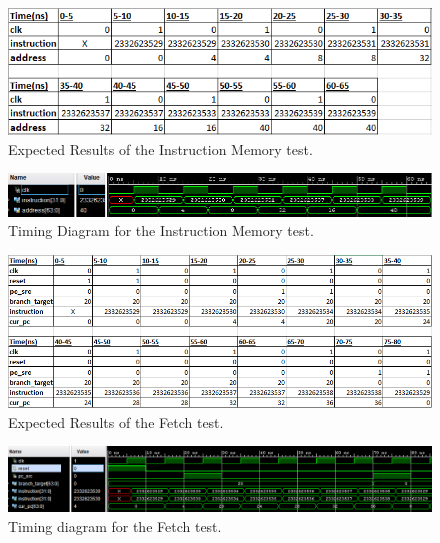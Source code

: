 \documentclass{article}
\begin{document}
\begin{figure}[H]
	\begin{center}
		\caption{Expected Results of the Instruction Memory test.}\label{fig:ert_instmemtest}
		\includegraphics[width=1.0\textwidth]{../images/InstrMemExpected.png}
	\end{center}
\end{figure}

\begin{figure}[H]
	\begin{center}
		\caption{Timing Diagram for the Instruction Memory test.}\label{fig:instmemtest}
		\includegraphics[width=1.0\textwidth]{../images/InstrMemSimulation.png}
	\end{center}
\end{figure}

\begin{figure}[H]
	\begin{center}
		\caption{Expected Results of the Fetch test.}\label{fig:ert_fetchtest}
		\includegraphics[width=1.0\textwidth]{../images/FetchExpected.png}
	\end{center}
\end{figure}

\begin{figure}[H]
	\begin{center}
		\caption{Timing diagram for the Fetch test.}\label{fig:fetchtest}
		\includegraphics[width=1.0\textwidth]{../images/FetchSimulation.png}
	\end{center}
\end{figure}
\end{document}
